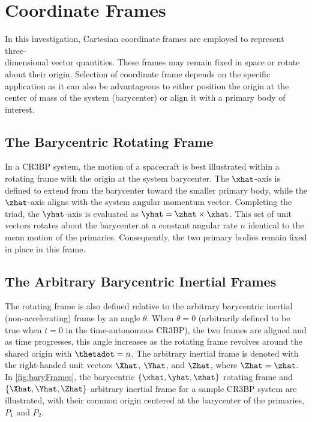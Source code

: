\section{Coordinate Frames}
In this investigation, Cartesian coordinate frames are employed to represent three-\\dimensional
vector quantities. These frames may remain fixed in space or rotate about their origin. Selection
of coordinate frame depends on the specific application as it can also be advantageous to either
position the origin at the center of mass of the system (barycenter) or align it with a primary
body of interest.

\subsection{The Barycentric Rotating Frame}
In a CR3BP system, the motion of a spacecraft is best illustrated within a rotating frame with the
origin at the system barycenter. The $\xhat$-axis is defined to extend from the barycenter toward
the smaller primary body, while the $\zhat$-axis aligns with the system angular momentum vector.
Completing the triad, the $\yhat$-axis is evaluated as $\yhat=\zhat\times\xhat$. This set of unit
vectors rotates about the barycenter at a constant angular rate $n$ identical to the mean motion of
the primaries. Consequently, the two primary bodies remain fixed in place in this frame.

\subsection{The Arbitrary Barycentric Inertial Frames}
The rotating frame is also defined relative to the arbitrary barycentric inertial (non-accelerating)
frame by an angle $\theta$. When $\theta=0$ (arbitrarily defined to be true when $t=0$ in the
time-autonomous CR3BP), the two frames are aligned and as time progresses, this angle increases as
the rotating frame revolves around the shared origin with $\thetadot=n$. The arbitrary inertial
frame is denoted with the right-handed unit vectors $\Xhat$, $\Yhat$, and $\Zhat$, where
$\Zhat=\zhat$. In \cref{fig:baryFrames}, the barycentric $\{\xhat,\yhat,\zhat\}$ rotating frame and
$\{\Xhat,\Yhat,\Zhat\}$ arbitrary inertial frame for a sample CR3BP system are illustrated, with
their common origin centered at the barycenter of the primaries, $P_{1}$ and $P_{2}$.

